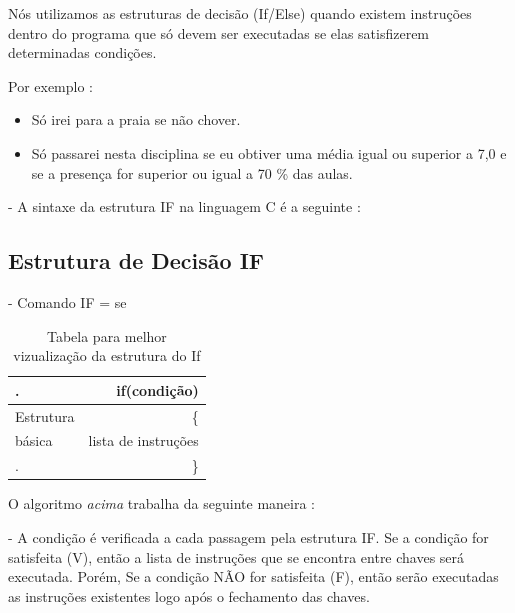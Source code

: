 \documentclass[a4paper,10pt]{article}  %
\begin{document}
    Nós utilizamos as estruturas de decisão (If/Else) quando existem instruções
dentro do programa que só devem ser executadas se elas satisfizerem  
determinadas condições. \newline

Por exemplo :

\begin{itemize}
               
       \item  Só irei para a praia se não chover. 
       \item  Só passarei nesta disciplina se eu obtiver uma média igual ou superior a 7,0 e se a presença for superior ou igual a 70 \% das aulas.
             
\end{itemize}

   - A sintaxe da estrutura IF na linguagem C é a seguinte :
 
 \subsection{Estrutura de Decisão IF}   
       
  -  Comando IF = se
   
\begin{table}[H]
\begin{center}
 \caption{Tabela para melhor vizualização da estrutura do If}
\begin{tabular}{|l|r|}
  \hline \hline
  
  .          & if(condição) \\ \hline
  Estrutura  &  \{           \\ \hline
    básica   &   lista de instruções  \\ \hline
  .          &  \}             \\ \hline
  
\end{tabular}
\label{tab:resultados}
\end{center}
\end{table}


  O algoritmo \textit{acima} trabalha da seguinte maneira :
 

  -  A condição é verificada a cada passagem pela estrutura IF. Se a condição for satisfeita (V), então a lista de instruções que se encontra entre chaves será executada. \newline
   Porém, Se a condição NÃO for satisfeita (F), então serão executadas as instruções existentes logo após o fechamento das chaves.
 
\end{document}
